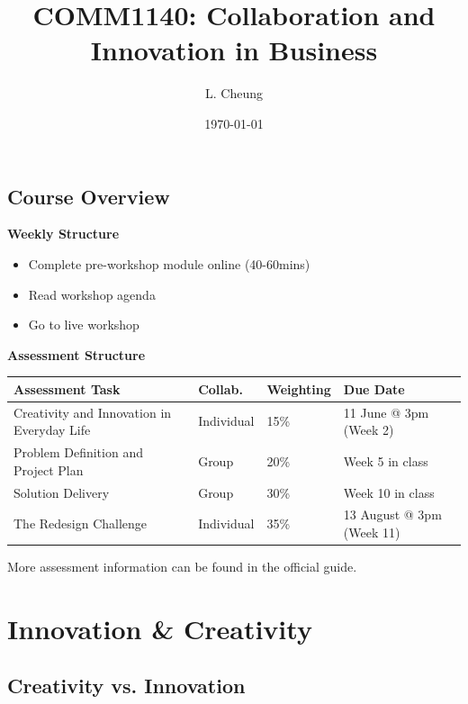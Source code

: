 \documentclass{report}
\title{\textbf{COMM1140: Collaboration and Innovation in Business}}
\author{L. Cheung}
\date{\today}
\begin{document}
\maketitle
\tableofcontents

\newpage

\section{Course Overview}

	\textbf{Weekly Structure}

		\begin{itemize}
			\item Complete pre-workshop module online (40-60mins)
			\item Read workshop agenda
			\item Go to live workshop
		\end{itemize}

	\textbf{Assessment Structure}
		
		\begin{table}[H]
			\centering
			\begin{tabular}[c]{p{7cm}|p{2cm}|p{2cm}|p{5cm}}
				\hline
				\textbf{Assessment Task}		& \textbf{Collab.} & \textbf{Weighting} & \textbf{Due Date}	\\
				\hline
				Creativity and Innovation in Everyday Life	& Individual	& 15\%		& 11 June @ 3pm (Week 2)		\\
				Problem Definition and Project Plan			& Group			& 20\%		& Week 5 in class				\\
				Solution Delivery							& Group			& 30\%		& Week 10 in class				\\
				The Redesign Challenge						& Individual	& 35\%		& 13 August @ 3pm (Week 11)		\\
				\hline
			\end{tabular}
		\end{table}

		More assessment information can be found in the official guide.

\chapter{Innovation \& Creativity}

	\section{Creativity vs. Innovation}
\end{document}
